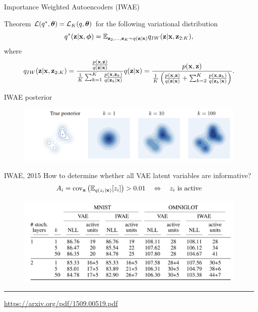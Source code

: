 \begin{frame}{Importance Weighted Autoencoders (IWAE)}
	\begin{block}{Theorem}
		$\mathcal{L}(q^*, \boldsymbol{\theta}) = \mathcal{L}_K(q, \boldsymbol{\theta})$
		for the following variational distribution
		\[
		q^*(\mathbf{z} | \mathbf{x}, \boldsymbol{\phi}) = \mathbb{E}_{\mathbf{z}_2, \dots, \mathbf{z}_K \sim q(\mathbf{z} | \mathbf{x})} q_{IW}(\mathbf{z} | \mathbf{x}, \mathbf{z}_{2:K}),
		\]
		where
		\vspace{-0.4cm}
		\[
			q_{IW}(\mathbf{z} | \mathbf{x}, \mathbf{z}_{2:K}) = \frac{\frac{p(\mathbf{x}, \mathbf{z})}{q(\mathbf{z} | \mathbf{x})}}{\frac{1}{K} \sum_{k=1}^K \frac{p(\mathbf{x}, \mathbf{z}_k)}{q(\mathbf{z}_k | \mathbf{x})}} q(\mathbf{z} | \mathbf{x}) = \frac{p(\mathbf{x}, \mathbf{z})}{\frac{1}{K}\left( \frac{p(\mathbf{x}, \mathbf{z})}{q(\mathbf{z} | \mathbf{x})} + \sum_{k=2}^K \frac{p(\mathbf{x}, \mathbf{z}_k)}{q(\mathbf{z}_k | \mathbf{x})}\right)}.
		\]
	\end{block}
	\vspace{-0.5cm}
	\begin{block}{IWAE posterior}
		\vspace{-0.3cm}
		\begin{figure}
			\centering
			\includegraphics[width=\linewidth]{figs/IWAE_1.png}
		\end{figure}
	\end{block}

\end{frame}
\begin{frame}{IWAE, 2015}
	How to determine whether all VAE latent variables are informative?
	\[
	A_{i} = \text{cov}_{\mathbf{x}} \left( \mathbb{E}_{q(z_i | \mathbf{x})} [z_i] \right) > 0.01 \quad \Leftrightarrow \quad z_i \text{ is active}
	\]
	\begin{figure}
		\centering
		\includegraphics[width=\linewidth]{figs/IWAE_3.png}
	\end{figure}
	\vfill
	\hrule\medskip
	{\scriptsize \href{https://arxiv.org/pdf/1509.00519.pdf}{https://arxiv.org/pdf/1509.00519.pdf}}
\end{frame}
